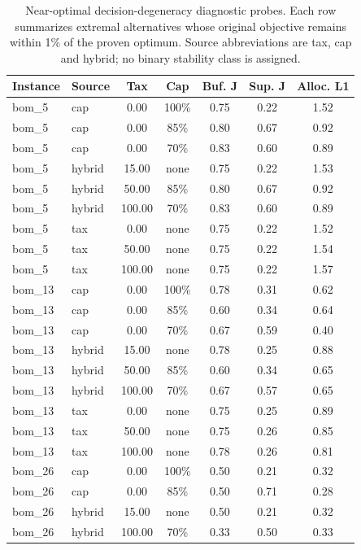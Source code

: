 \begin{table}[!htbp]\centering\scriptsize
\setlength{\tabcolsep}{3pt}
\caption{Near-optimal decision-degeneracy diagnostic probes. Each row summarizes extremal alternatives whose original objective remains within 1\% of the proven optimum. Source abbreviations are tax, cap and hybrid; no binary stability class is assigned.}\label{tab:stability}
\begin{tabular}{llccccc}
\toprule
Instance & Source & Tax & Cap & Buf. J & Sup. J & Alloc. L1\\
\midrule
bom\_5 & cap & 0.00 & 100\% & 0.75 & 0.22 & 1.52 \\
bom\_5 & cap & 0.00 & 85\% & 0.80 & 0.67 & 0.92 \\
bom\_5 & cap & 0.00 & 70\% & 0.83 & 0.60 & 0.89 \\
bom\_5 & hybrid & 15.00 & none & 0.75 & 0.22 & 1.53 \\
bom\_5 & hybrid & 50.00 & 85\% & 0.80 & 0.67 & 0.92 \\
bom\_5 & hybrid & 100.00 & 70\% & 0.83 & 0.60 & 0.89 \\
bom\_5 & tax & 0.00 & none & 0.75 & 0.22 & 1.52 \\
bom\_5 & tax & 50.00 & none & 0.75 & 0.22 & 1.54 \\
bom\_5 & tax & 100.00 & none & 0.75 & 0.22 & 1.57 \\
bom\_13 & cap & 0.00 & 100\% & 0.78 & 0.31 & 0.62 \\
bom\_13 & cap & 0.00 & 85\% & 0.60 & 0.34 & 0.64 \\
bom\_13 & cap & 0.00 & 70\% & 0.67 & 0.59 & 0.40 \\
bom\_13 & hybrid & 15.00 & none & 0.78 & 0.25 & 0.88 \\
bom\_13 & hybrid & 50.00 & 85\% & 0.60 & 0.34 & 0.65 \\
bom\_13 & hybrid & 100.00 & 70\% & 0.67 & 0.57 & 0.65 \\
bom\_13 & tax & 0.00 & none & 0.75 & 0.25 & 0.89 \\
bom\_13 & tax & 50.00 & none & 0.75 & 0.26 & 0.85 \\
bom\_13 & tax & 100.00 & none & 0.78 & 0.26 & 0.81 \\
bom\_26 & cap & 0.00 & 100\% & 0.50 & 0.21 & 0.32 \\
bom\_26 & cap & 0.00 & 85\% & 0.50 & 0.71 & 0.28 \\
bom\_26 & hybrid & 15.00 & none & 0.50 & 0.21 & 0.32 \\
bom\_26 & hybrid & 100.00 & 70\% & 0.33 & 0.50 & 0.33 \\

\end{tabular}
\end{table}
